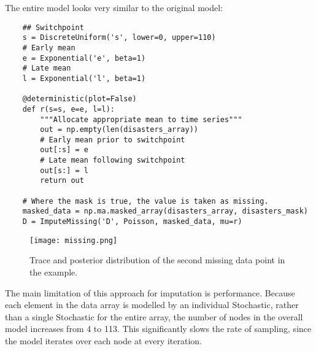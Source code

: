 The entire model looks very similar to the original model:

\begin{verbatim}
	## Switchpoint
	s = DiscreteUniform('s', lower=0, upper=110)   
	# Early mean
	e = Exponential('e', beta=1)
	# Late mean
	l = Exponential('l', beta=1)   

	@deterministic(plot=False)
	def r(s=s, e=e, l=l):
	    """Allocate appropriate mean to time series"""
	    out = np.empty(len(disasters_array))
	    # Early mean prior to switchpoint
	    out[:s] = e
	    # Late mean following switchpoint
	    out[s:] = l
	    return out

	# Where the mask is true, the value is taken as missing. 
	masked_data = np.ma.masked_array(disasters_array, disasters_mask)
	D = ImputeMissing('D', Poisson, masked_data, mu=r)
\end{verbatim}

\begin{figure}[ht]
\begin{center}
\texttt{[image: missing.png]}
\caption{Trace and posterior distribution of the second missing data point in the example.}
\label{fig:missing}
\end{center}
\end{figure}

The main limitation of this approach for imputation is performance. Because each element in the data array is modelled by an individual Stochastic, rather than a single Stochastic for the entire array, the number of nodes in the overall model increases from 4 to 113. This significantly slows the rate of sampling, since the model iterates over each node at every iteration.

